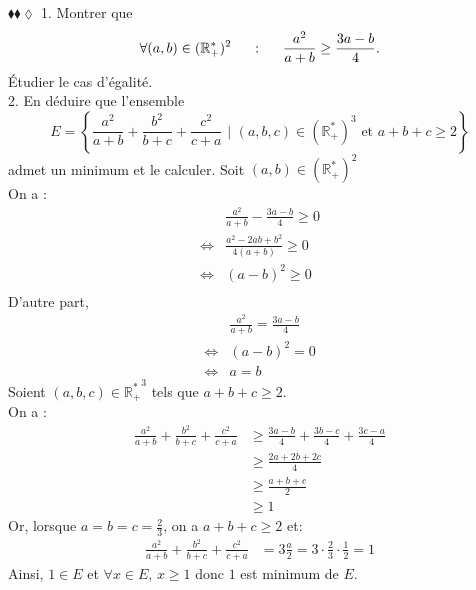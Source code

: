 \documentclass[11pt]{article}
\begin{document}
\begin{exercice}{$\blacklozenge\blacklozenge\lozenge$}{}
    1. Montrer que
    \begin{equation*}
        \forall(a,b)\in(\mathbb{R}^*_+)^2\hspace{0.5cm}:\hspace{0.5cm}\frac{a^2}{a+b}\geq\frac{3a-b}{4}.
    \end{equation*}
    Étudier le cas d'égalité.\\
    2. En déduire que l'ensemble
    \begin{equation*}
        E=\left\{\frac{a^2}{a+b}+\frac{b^2}{b+c}+\frac{c^2}{c+a} \text{ | } (a,b,c)\in(\mathbb{R^*_+})^3 \text{ et } a+b+c\geq2 \right\}
    \end{equation*}
    admet un minimum et le calculer.
    \tcblower
     Soit $(a,b)\in(\mathbb{R}^*_+)^2$\\
    On a :
    \begin{align*}
        &\frac{a^2}{a+b}-\frac{3a-b}{4}\geq0\\
        \iff&\frac{a^2-2ab+b^2}{4(a+b)}\geq0\\
        \iff&(a-b)^2\geq0\\
    \end{align*}
    D'autre part,
    \begin{align*}
        &\frac{a^2}{a+b}=\frac{3a-b}{4}\\
        \iff&(a-b)^2=0\\
        \iff&a=b
    \end{align*}
     Soient $(a,b,c)\in\mathbb{R^*_+}^3$ tels que $a+b+c\geq2$.\\
    On a :
    \begin{align*}
        \frac{a^2}{a+b}+\frac{b^2}{b+c}+\frac{c^2}{c+a}
        &\geq\frac{3a-b}{4}+\frac{3b-c}{4}+\frac{3c-a}{4}\\
        &\geq\frac{2a+2b+2c}{4}\\
        &\geq\frac{a+b+c}{2}\\
        &\geq1
    \end{align*}
    Or, lorsque $a=b=c=\frac{2}{3}$, on a $a+b+c\geq2$ et:
    \begin{align*}
        \frac{a^2}{a+b}+\frac{b^2}{b+c}+\frac{c^2}{c+a}
        &=3\frac{a}{2}=3\cdot\frac{2}{3}\cdot\frac{1}{2}=1
    \end{align*}
    Ainsi, $1\in E$ et $\forall{x\in E}$, $x\geq1$ donc $1$ est minimum de $E$.
\end{exercice}
\end{document}
